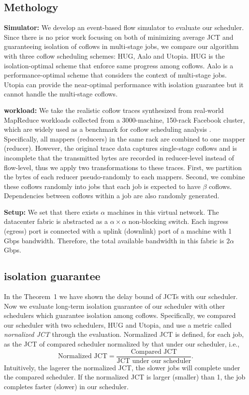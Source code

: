 \documentclass[10pt, conference, letterpaper]{IEEEtran}
\begin{document}
\subsection{Methology}
\noindent\textbf{Simulator:} We develop an event-based flow simulator to evaluate our scheduler. Since there is no prior work focusing on both of minimizing average JCT and guaranteeing isolation of coflows in multi-stage jobs, we compare our algorithm with three coflow scheduling schemes: HUG\cite{HUG}, Aalo\cite{aalo} and Utopia\cite{utopia}. HUG is the isolation-optimal scheme that enforce same progress among coflows. Aalo is a performance-optimal scheme that considers the context of multi-stage jobs. Utopia can provide the near-optimal performance with isolation guarantee but it cannot handle the multi-stage coflows.

\noindent\textbf{workload:} We take the realistic coflow traces\cite{benchmark} synthesized from real-world MapReduce workloads collected from a 3000-machine, 150-rack Facebook cluster, which are widely used as a benchmark for coflow scheduling analysis\cite{varys,aalo,minimizing,fair} . Specifically, all mappers (reducers) in the same rack are combined to one mapper (reducer). However, the original trace data captures single-stage coflows and is incomplete that the transmitted bytes are recorded in reducer-level instead of flow-level, thus we apply two transformations to these traces. First, we partition the bytes of each reducer pseudo-randomly to each mappers. Second, we combine these coflows randomly into jobs that each job is expected to have $\beta$ coflows. Dependencies between coflows within a job are also randomly generated.

\noindent\textbf{Setup:} We set that there exists $\alpha$ machines in this virtual network. The datacenter fabric is abstracted as a $\alpha \times \alpha$ non-blocking switch. Each ingress (egress) port is connected with a uplink (downlink) port of a machine with 1 Gbps bandwidth. Therefore, the total available bandwidth in this fabric is $2\alpha$ Gbps.

\subsection{isolation guarantee}
In the Theorem~1 we have shown the delay bound of JCTs with our scheduler. Now we evaluate long-term isolation guarantee of our scheduler with other schedulers which guarantee isolation among coflows. Specifically, we compared our scheduler with two schedulers, HUG and Utopia, and use a metric called \emph{nornalized JCT} through the evaluation. Normalized JCT is defined, for each job, as the JCT of compared scheduler normalized by that under our scheduler, i.e.,
\[\text{Normalized JCT} = \frac{\text{Compared JCT}}{\text{JCT under our scheduler}}.\]
Intuitively, the lagerer the normalized JCT, the slower jobs will complete under the compared scheduler. If the normalized JCT is larger (smaller) than 1, the job completes faster (slower) in our scheduler.
\end{document}
